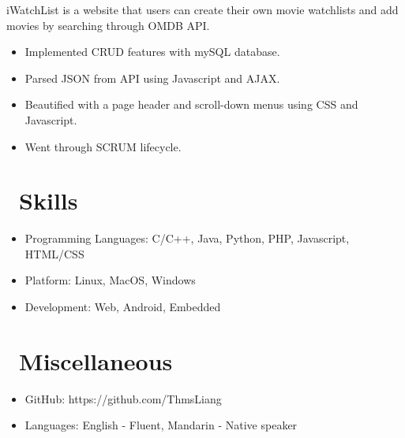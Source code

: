 \documentclass{resume}
\begin{document}
iWatchList is a website that users can create their own movie watchlists and add movies by searching through OMDB API.
\begin{itemize}
  \item Implemented CRUD features with mySQL database.
  \item Parsed JSON from API using Javascript and AJAX.
  \item Beautified with a page header and scroll-down menus using CSS and Javascript.
  \item Went through SCRUM lifecycle.
\end{itemize}



\section{\faCogs\ Skills}
\begin{itemize}[parsep=0.5ex]
  \item Programming Languages: C/C++, Java, Python, PHP, Javascript, HTML/CSS
  \item Platform: Linux, MacOS, Windows
  \item Development: Web, Android, Embedded
\end{itemize}

\section{\faInfo\ Miscellaneous}
\begin{itemize}[parsep=0.5ex]
  \item GitHub: https://github.com/ThmsLiang
  \item Languages: English - Fluent, Mandarin - Native speaker
\end{itemize}

%
%
\end{document}
